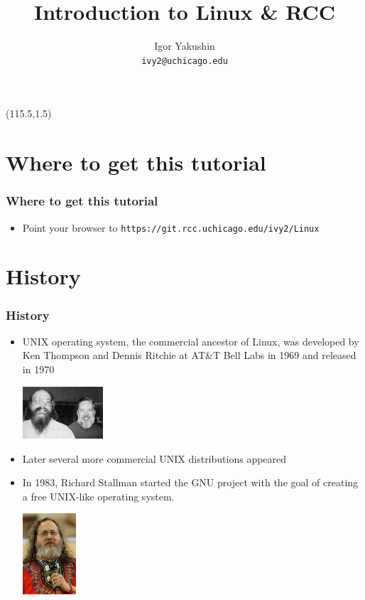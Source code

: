 \documentclass{beamer}
\title{\huge{Introduction to Linux \& RCC}}
\author{Igor Yakushin \\ \texttt{ivy2@uchicago.edu}}
\newcommand{\RCCLogo}{
\begin{textblock}{14}(1.5,1.5)
  \pgfuseimage{logo_rcc}
\end{textblock}
}
\newcommand{\TUX}{
\begin{textblock}{14}(115.5,1.5)
  \pgfuseimage{tux}
\end{textblock}
}
\begin{document}



\begin{frame}
\TUX
\titlepage
\end{frame}

\section{Where to get this tutorial}
\begin{frame}[fragile]
  \frametitle{Where to get this tutorial}
  \begin{itemize}
  \item Point your browser to  {\color{mycolorcli}\verb|https://git.rcc.uchicago.edu/ivy2/Linux|}
  \end{itemize}
\end{frame}

\section{History}
\begin{frame}[fragile]
  \frametitle{History}
  \begin{itemize}
  \item UNIX operating system, the commercial ancestor of Linux, was developed by Ken Thompson and Dennis Ritchie at AT\&T Bell Labs in 1969 and released in 1970
\begin{center}
\includegraphics[width=3cm]{graphs/Ken_n_dennis.jpg}
\end{center}
  \item Later several more commercial UNIX distributions appeared
  \item In 1983, Richard Stallman started the GNU project with the goal of creating a free UNIX-like operating system.
\begin{center}
\includegraphics[width=2cm]{graphs/Richard_Stallman.jpg}
\end{center}
\end{itemize}
\end{frame}
\end{document}

